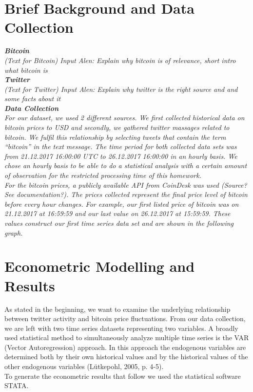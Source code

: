 \documentclass[a4paper,american,12pt]{article}
\begin{document}
\begin{spacing}{1.2}
		\section{Brief Background and Data Collection}
		\itshape\textbf {Bitcoin}\\
		\textnormal {(Text for Bitcoin) Input Alen: Explain why bitcoin is of relevance, short intro what bitcoin is}\\
		
		\itshape\textbf {Twitter}\\
		\textnormal {(Text for Twitter) Input Alen: Explain why twitter is the right source and and some facts about it}\\
		
		\itshape\textbf {Data Collection}\\
		\textnormal {For our dataset, we used 2 different sources. We first collected historical data on bitcoin prices to USD and secondly, we gathered twitter massages related to bitcoin. We fulfil this relationship by selecting tweets that contain the term “bitcoin” in the text message. The time period for both collected data sets was from 21.12.2017 16:00:00 UTC to 26.12.2017 16:00:00 in an hourly basis. We chose an hourly basis to be able to do a statistical analysis with a certain amount of observation for the restricted processing time of this homework.\\
For the bitcoin prices, a publicly available API from CoinDesk was used (Source? See documentation?). The prices collected represent the final price level of bitcoin before every hour changes. For example, our first listed price of bitcoin was on 21.12.2017 at 16:59:59 and our last value on 26.12.2017 at 15:59:59. These values construct our first time series data set and are shown in the following graph.\\}
				
		\clearpage
		
		\section{Econometric Modelling and Results}
		\textnormal {As stated in the beginning, we want to examine the underlying relationship between twitter activity and bitcoin price fluctuations. From our data collection, we are left with two time series datasets representing two variables. A broadly used statistical method to simultaneously analyze multiple time series is the VAR (Vector Autoregression) approach. In this approach the endogenous variables are determined both by their own historical values and by the historical values of the other endogenous variables (Lütkepohl, 2005, p. 4-5).\\
To generate the econometric results that follow we used the statistical software STATA.}


\end{spacing}
\end{document}
